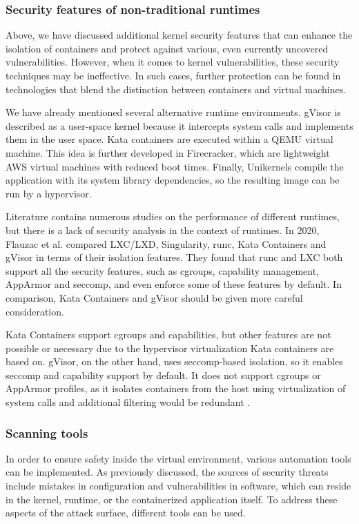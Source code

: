 \subsubsection{Security features of non-traditional runtimes}

Above, we have discussed additional kernel security features that can enhance the isolation of containers and protect against various, even currently uncovered vulnerabilities. However, when it comes to kernel vulnerabilities, these security techniques may be ineffective. In such cases, further protection can be found in technologies that blend the distinction between containers and virtual machines.

We have already mentioned several alternative runtime environments. gVisor is described as a user-space kernel because it intercepts system calls and implements them in the user space. Kata containers are executed within a QEMU virtual machine. This idea is further developed in Firecracker, which are lightweight AWS virtual machines with reduced boot times. Finally, Unikernels compile the application with its system library dependencies, so the resulting image can be run by a hypervisor.

Literature contains numerous studies on the performance of different runtimes, but there is a lack of security analysis in the context of runtimes. In 2020, Flauzac et al. compared LXC/LXD, Singularity, runc, Kata Containers and gVisor in terms of their isolation features. They found that runc and LXC both support all the security features, such as cgroups, capability management, AppArmor and seccomp, and even enforce some of these features by default. In comparison, Kata Containers and gVisor should be given more careful consideration.

Kata Containers support cgroups and capabilities, but other features are not possible or necessary due to the hypervisor virtualization Kata containers are based on. gVisor, on the other hand, uses seccomp-based isolation, so it enables seccomp and capability support by default. It does not support cgroups or AppArmor profiles, as it isolates containers from the host using virtualization of system calls and additional filtering would be redundant \cite{pcs:1}.

\subsubsection{Scanning tools}

In order to ensure safety inside the virtual environment, various automation tools can be implemented. As previously discussed, the sources of security threats include mistakes in configuration and vulnerabilities in software, which can reside in the kernel, runtime, or the containerized application itself. To address these aspects of the attack surface, different tools can be used.

